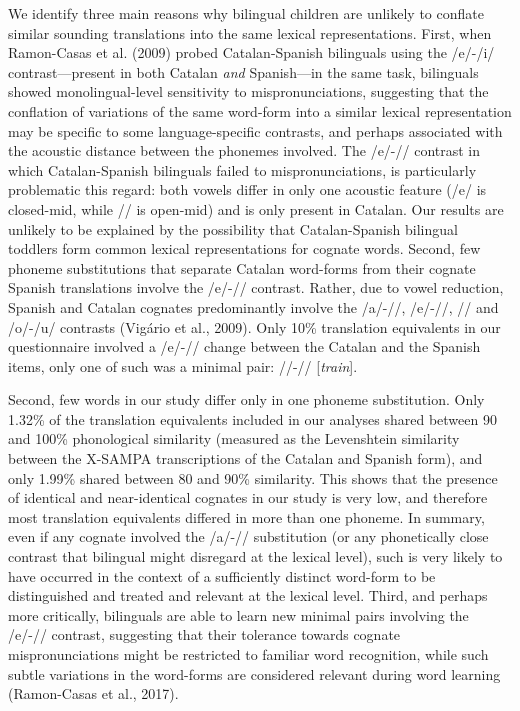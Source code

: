 \documentclass[
  man,
  floatsintext,
  colorlinks=true,linkcolor=blue,citecolor=blue,urlcolor=blue,biblatex]{apa7}
\begin{document}
We identify three main reasons why bilingual children are unlikely to
conflate similar sounding translations into the same lexical
representations. First, when Ramon-Casas et al. (2009) probed
Catalan-Spanish bilinguals using the /e/-/i/ contrast---present in both
Catalan \emph{and} Spanish---in the same task, bilinguals showed
monolingual-level sensitivity to mispronunciations, suggesting that the
conflation of variations of the same word-form into a similar lexical
representation may be specific to some language-specific contrasts, and
perhaps associated with the acoustic distance between the phonemes
involved. The /e/-/\textepsilon/ contrast in which Catalan-Spanish
bilinguals failed to mispronunciations, is particularly problematic this
regard: both vowels differ in only one acoustic feature (/e/ is
closed-mid, while /\textepsilon/ is open-mid) and is only present in
Catalan. Our results are unlikely to be explained by the possibility
that Catalan-Spanish bilingual toddlers form common lexical
representations for cognate words. Second, few phoneme substitutions
that separate Catalan word-forms from their cognate Spanish translations
involve the /e/-/\textepsilon/ contrast. Rather, due to vowel reduction,
Spanish and Catalan cognates predominantly involve the /a/-/\textschwa/,
/e/-/\textschwa/, /\textepsilon/ and /o/-/u/ contrasts (Vigário et al.,
2009). Only 10\% translation equivalents in our questionnaire involved a
/e/-/\textepsilon/ change between the Catalan and the Spanish items,
only one of such was a minimal pair: //-//
{[}\emph{train}{]}.

Second, few words in our study differ only in one phoneme substitution.
Only 1.32\% of the translation equivalents included in our analyses
shared between 90 and 100\% phonological similarity (measured as the
Levenshtein similarity between the X-SAMPA transcriptions of the Catalan
and Spanish form), and only 1.99\% shared between 80 and 90\%
similarity. This shows that the presence of identical and near-identical
cognates in our study is very low, and therefore most translation
equivalents differed in more than one phoneme. In summary, even if any
cognate involved the /a/-/\textepsilon/ substitution (or any
phonetically close contrast that bilingual might disregard at the
lexical level), such is very likely to have occurred in the context of a
sufficiently distinct word-form to be distinguished and treated and
relevant at the lexical level. Third, and perhaps more critically,
bilinguals are able to learn new minimal pairs involving the
/e/-/\textepsilon/ contrast, suggesting that their tolerance towards
cognate mispronunciations might be restricted to familiar word
recognition, while such subtle variations in the word-forms are
considered relevant during word learning (Ramon-Casas et al., 2017).
\end{document}
